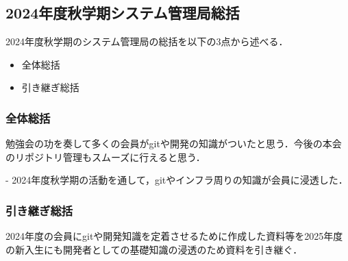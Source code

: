 \subsection*{2024年度秋学期システム管理局総括}


2024年度秋学期のシステム管理局の総括を以下の3点から述べる．
\begin{itemize}
    \item 全体総括
    \item 引き継ぎ総括
\end{itemize}

\subsubsection*{全体総括}
勉強会の功を奏して多くの会員がgitや開発の知識がついたと思う．今後の本会のリポジトリ管理もスムーズに行えると思う．

- 2024年度秋学期の活動を通して，gitやインフラ周りの知識が会員に浸透した．

\subsubsection*{引き継ぎ総括}
2024年度の会員にgitや開発知識を定着させるために作成した資料等を2025年度の新入生にも開発者としての基礎知識の浸透のため資料を引き継ぐ．
